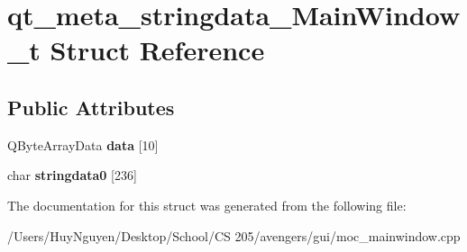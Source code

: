 \hypertarget{structqt__meta__stringdata__MainWindow__t}{}\section{qt\+\_\+meta\+\_\+stringdata\+\_\+\+Main\+Window\+\_\+t Struct Reference}
\label{structqt__meta__stringdata__MainWindow__t}
\subsection*{Public Attributes}
\begin{DoxyCompactItemize}
\item 
Q\+Byte\+Array\+Data {\bfseries data} \mbox{[}10\mbox{]}\hypertarget{structqt__meta__stringdata__MainWindow__t_a53f42f958104d9adeaa605fb0083f943}{}\label{structqt__meta__stringdata__MainWindow__t_a53f42f958104d9adeaa605fb0083f943}

\item 
char {\bfseries stringdata0} \mbox{[}236\mbox{]}\hypertarget{structqt__meta__stringdata__MainWindow__t_a77e3472aaefa1f7dbb4451d6a9cdcb91}{}\label{structqt__meta__stringdata__MainWindow__t_a77e3472aaefa1f7dbb4451d6a9cdcb91}

\end{DoxyCompactItemize}


The documentation for this struct was generated from the following file\+:\begin{DoxyCompactItemize}
\item 
/\+Users/\+Huy\+Nguyen/\+Desktop/\+School/\+C\+S 205/avengers/gui/moc\+\_\+mainwindow.\+cpp\end{DoxyCompactItemize}
